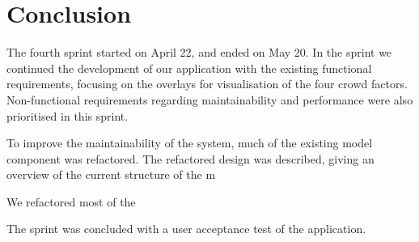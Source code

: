 \section{Conclusion} \label{sec:s4_conclusion}
The fourth sprint started on April 22, and ended on May 20. In the sprint we continued the development of our application with the existing functional requirements, focusing on the overlays for visualisation of the four crowd factors. Non-functional requirements  regarding maintainability and performance were also prioritised in this sprint.

To improve the maintainability of the system, much of the existing model component was refactored. The refactored design was described, giving an overview of the current structure of the m

We refactored most of the 

The sprint was concluded with a user acceptance test of the application. 

